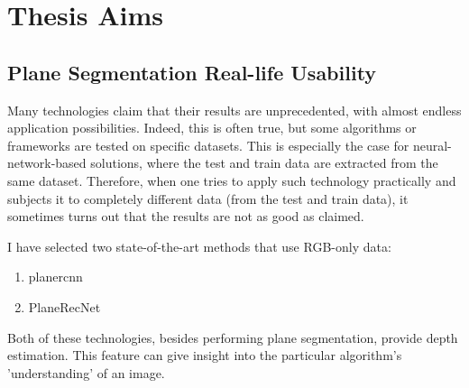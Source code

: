 
\chapter{Thesis Aims} \label{chap:thesis-aims}

\section{Plane Segmentation Real-life Usability}

Many technologies claim that their results are unprecedented, with almost endless application possibilities.
Indeed, this is often true, but some algorithms or frameworks are tested on specific datasets.
This is especially the case for neural-network-based solutions, where the test and train data are extracted from the same dataset.
Therefore, when one tries to apply such technology practically and subjects it to completely different data (from the test and train data), it sometimes turns out that the results are not as good as claimed.

\par

I have selected two state-of-the-art methods that use RGB-only data:

\begin{enumerate}
    \item planercnn \cite{articlePlaneRCNN}
    \item PlaneRecNet \cite{xie2021planerecnet}
\end{enumerate}

Both of these technologies, besides performing plane segmentation, provide depth estimation.
This feature can give insight into the particular algorithm's 'understanding' of an image.
